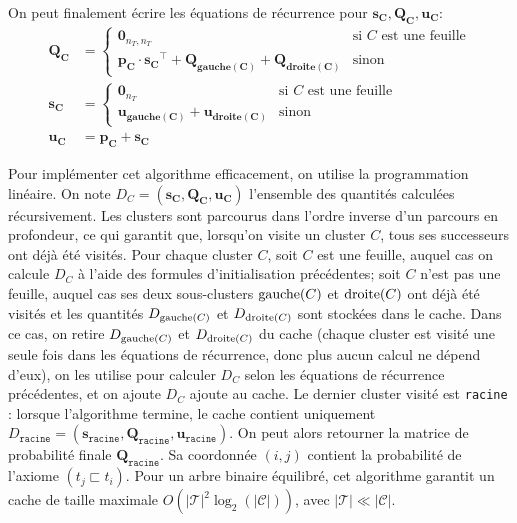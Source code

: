 On peut finalement écrire les équations de récurrence pour $\mathbf{s_C}, \mathbf{Q_C}, \mathbf{u_C}$:
\begin{align}
    \mathbf{Q_C} &=
    \begin{cases}
      \mathbf{0}_{n_T,n_T} & \text{si $C$ est une feuille}\\
      \mathbf{p_C} \cdot \mathbf{s_C}^\top + \mathbf{Q_\text{gauche$(C)$}} + \mathbf{Q_\text{droite$(C)$}} & \text{sinon}
    \end{cases}  \\
  \mathbf{s_C} &=
    \begin{cases}
      \mathbf{0}_{n_T} & \text{si $C$ est une feuille}\\
      \mathbf{u_\text{gauche$(C)$}} + \mathbf{u_\text{droite$(C)$}} & \text{sinon}
    \end{cases}  \\
    \mathbf{u_C} &= \mathbf{p_C} + \mathbf{s_C}
\end{align}

Pour implémenter cet algorithme efficacement, on utilise la programmation linéaire. On note $D_C = (\mathbf{s_C}, \mathbf{Q_C}, \mathbf{u_C})$ l'ensemble des quantités calculées récursivement. Les clusters sont parcourus dans l'ordre inverse d'un parcours en profondeur, ce qui garantit que, lorsqu'on visite un cluster $C$, tous ses successeurs ont déjà été visités. Pour chaque cluster $C$, soit $C$ est une feuille, auquel cas on calcule $D_C$ à l'aide des formules d'initialisation précédentes; soit $C$ n'est pas une feuille, auquel cas ses deux sous-clusters $\operatorname{gauche}(C)$ et $\operatorname{droite}(C)$ ont déjà été visités et les quantités $D_{\operatorname{gauche}(C)}$ et $D_{\operatorname{droite}(C)}$ sont stockées dans le cache. Dans ce cas, on retire $D_{\operatorname{gauche}(C)}$ et $D_{\operatorname{droite}(C)}$ du cache (chaque cluster est visité une seule fois dans les équations de récurrence, donc plus aucun calcul ne dépend d'eux), on les utilise pour calculer $D_C$ selon les équations de récurrence précédentes, et on ajoute $D_C$ ajoute au cache. Le dernier cluster visité est \texttt{racine} : lorsque l'algorithme termine, le cache contient uniquement $D_\texttt{racine} = (\mathbf{s_\texttt{racine}}, \mathbf{Q_\texttt{racine}}, \mathbf{u_\texttt{racine}})$. On peut alors retourner la matrice de probabilité finale $\mathbf{Q_\texttt{racine}}$. Sa coordonnée $(i, j)$ contient la probabilité de l'axiome $(t_j \sqsubset t_i)$.
Pour un arbre binaire équilibré, cet algorithme garantit un cache de taille maximale $O(|\mathcal{T}|^2 \log_2(| \mathcal{C} |))$, avec $|\mathcal{T}| \ll | \mathcal{C} |$.


